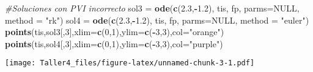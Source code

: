 \documentclass[]{article}
\newenvironment{Shaded}{\begin{snugshade}}{\end{snugshade}}
\newcommand{\KeywordTok}[1]{\textcolor[rgb]{0.13,0.29,0.53}{\textbf{#1}}}
\newcommand{\DataTypeTok}[1]{\textcolor[rgb]{0.13,0.29,0.53}{#1}}
\newcommand{\DecValTok}[1]{\textcolor[rgb]{0.00,0.00,0.81}{#1}}
\newcommand{\FloatTok}[1]{\textcolor[rgb]{0.00,0.00,0.81}{#1}}
\newcommand{\StringTok}[1]{\textcolor[rgb]{0.31,0.60,0.02}{#1}}
\newcommand{\CommentTok}[1]{\textcolor[rgb]{0.56,0.35,0.01}{\textit{#1}}}
\newcommand{\OtherTok}[1]{\textcolor[rgb]{0.56,0.35,0.01}{#1}}
\newcommand{\OperatorTok}[1]{\textcolor[rgb]{0.81,0.36,0.00}{\textbf{#1}}}
\newcommand{\NormalTok}[1]{#1}
\begin{document}
\begin{Shaded}
\begin{Highlighting}[]
\CommentTok{#Soluciones con PVI incorrecto}
\NormalTok{sol3 =}\StringTok{ }\KeywordTok{ode}\NormalTok{(}\KeywordTok{c}\NormalTok{(}\FloatTok{2.3}\NormalTok{,}\OperatorTok{-}\FloatTok{1.2}\NormalTok{), tis, fp, }\DataTypeTok{parms=}\OtherTok{NULL}\NormalTok{, }\DataTypeTok{method =} \StringTok{"rk"}\NormalTok{)}
\NormalTok{sol4 =}\StringTok{ }\KeywordTok{ode}\NormalTok{(}\KeywordTok{c}\NormalTok{(}\FloatTok{2.3}\NormalTok{,}\OperatorTok{-}\FloatTok{1.2}\NormalTok{), tis, fp, }\DataTypeTok{parms=}\OtherTok{NULL}\NormalTok{, }\DataTypeTok{method =} \StringTok{"euler"}\NormalTok{)}
\KeywordTok{points}\NormalTok{(tis,sol3[,}\DecValTok{3}\NormalTok{],}\DataTypeTok{xlim=}\KeywordTok{c}\NormalTok{(}\DecValTok{0}\NormalTok{,}\DecValTok{1}\NormalTok{),}\DataTypeTok{ylim=}\KeywordTok{c}\NormalTok{(}\OperatorTok{-}\DecValTok{3}\NormalTok{,}\DecValTok{3}\NormalTok{),}\DataTypeTok{col=}\StringTok{"orange"}\NormalTok{)}
\KeywordTok{points}\NormalTok{(tis,sol4[,}\DecValTok{3}\NormalTok{],}\DataTypeTok{xlim=}\KeywordTok{c}\NormalTok{(}\DecValTok{0}\NormalTok{,}\DecValTok{1}\NormalTok{),}\DataTypeTok{ylim=}\KeywordTok{c}\NormalTok{(}\OperatorTok{-}\DecValTok{3}\NormalTok{,}\DecValTok{3}\NormalTok{),}\DataTypeTok{col=}\StringTok{"purple"}\NormalTok{)}
\end{Highlighting}
\end{Shaded}

\texttt{[image: Taller4\_files/figure-latex/unnamed-chunk-3-1.pdf]}
\end{document}
